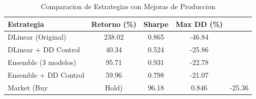 \begin{table}[H]
\centering
\caption{Comparacion de Estrategias con Mejoras de Produccion}
\label{tab:improvements}
\begin{tabular}{lccc}
\toprule
\textbf{Estrategia} & \textbf{Retorno (\%)} & \textbf{Sharpe} & \textbf{Max DD (\%)} \\
\midrule
DLinear (Original) & 238.02 & 0.865 & -46.84 \\
DLinear + DD Control & 40.34 & 0.524 & -25.86 \\
Ensemble (3 modelos) & 95.71 & 0.931 & -22.78 \\
Ensemble + DD Control & 59.96 & 0.798 & -21.07 \\
Market (Buy & Hold) & 96.18 & 0.846 & -25.36 \\
\bottomrule
\end{tabular}
\end{table}
